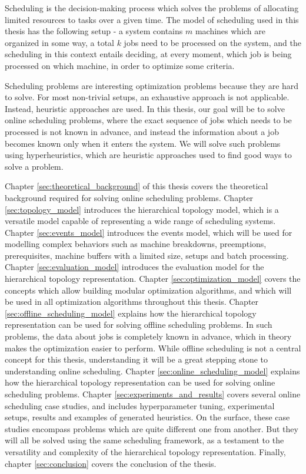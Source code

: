 Scheduling is the decision-making process which solves the problems of allocating limited resources to tasks over a given time. The model of scheduling used in this thesis has the following setup - a system contains $m$ machines which are organized in some way, a total $k$ jobs need to be processed on the system, and the scheduling in this context entails deciding, at every moment, which job is being processed on which machine, in order to optimize some criteria. 

Scheduling problems are interesting optimization problems because they are hard to solve. For most non-trivial setups, an exhaustive approach is not applicable. Instead, heuristic approaches are used. In this thesis, our goal will be to solve online scheduling problems, where the exact sequence of jobs which needs to be processed is not known in advance, and instead the information about a job becomes known only when it enters the system. We will solve such problems using hyperheuristics, which are heuristic approaches used to find good ways to solve a problem.

Chapter \ref{sec:theoretical_background} of this thesis covers the theoretical background required for solving online scheduling problems. Chapter \ref{sec:topology_model} introduces the hierarchical topology model, which is a versatile model capable of representing a wide range of scheduling systems. Chapter \ref{sec:events_model} introduces the events model, which will be used for modelling complex behaviors such as machine breakdowns, preemptions, prerequisites, machine buffers with a limited size, setups and batch processing. Chapter \ref{sec:evaluation_model} introduces the evaluation model for the hierarchical topology representation. Chapter \ref{sec:optimization_model} covers the concepts which allow building modular optimization algorithms, and which will be used in all optimization algorithms throughout this thesis. Chapter \ref{sec:offline_scheduling_model} explains how the hierarchical topology representation can be used for solving offline scheduling problems. In such problems, the data about jobs is completely known in advance, which in theory makes the optimization easier to perform. While offline scheduling is not a central concept for this thesis, understanding it will be a great stepping stone to understanding online scheduling. Chapter \ref{sec:online_scheduling_model} explains how the hierarchical topology representation can be used for solving online scheduling problems. Chapter \ref{sec:experiments_and_results} covers several online scheduling case studies, and includes hyperparameter tuning, experimental setups, results and examples of generated heuristics. On the surface, these case studies encompass problems which are quite different one from another. But they will all be solved using the same scheduling framework, as a testament to the versatility and complexity of the hierarchical topology representation. Finally, chapter \ref{sec:conclusion} covers the conclusion of the thesis.